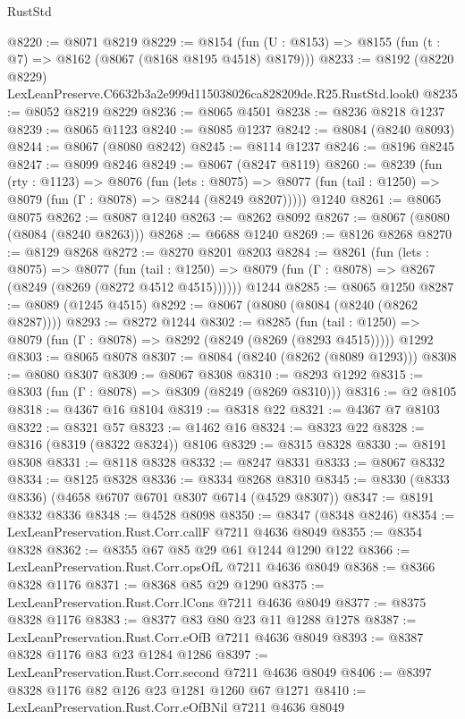 \begin{lexlean}{RustStd}
\begin{coremodule}
@8220 := @8071 @8219
@8229 := @8154 (fun (U : @8153) => @8155 (fun (t : @7) => @8162 (@8067 (@8168 @8195 @4518) @8179)))
@8233 := @8192 (@8220 @8229) LexLeanPreserve.C6632b3a2e999d115038026ca828209de.R25.RustStd.look0
@8235 := @8052 @8219 @8229
@8236 := @8065 @4501
@8238 := @8236 @8218 @1237
@8239 := @8065 @1123
@8240 := @8085 @1237
@8242 := @8084 (@8240 @8093)
@8244 := @8067 (@8080 @8242)
@8245 := @8114 @1237
@8246 := @8196 @8245
@8247 := @8099 @8246
@8249 := @8067 (@8247 @8119)
@8260 := @8239
    (fun (rty : @1123) =>
    @8076
      (fun (lets : @8075) =>
      @8077 (fun (tail : @1250) => @8079 (fun (Γ : @8078) => @8244 (@8249 @8207)))))
    @1240
@8261 := @8065 @8075
@8262 := @8087 @1240
@8263 := @8262 @8092
@8267 := @8067 (@8080 (@8084 (@8240 @8263)))
@8268 := @6688 @1240
@8269 := @8126 @8268
@8270 := @8129 @8268
@8272 := @8270 @8201 @8203
@8284 := @8261
    (fun (lets : @8075) =>
    @8077
      (fun (tail : @1250) => @8079 (fun (Γ : @8078) => @8267 (@8249 (@8269 (@8272 @4512 @4515))))))
    @1244
@8285 := @8065 @1250
@8287 := @8089 (@1245 @4515)
@8292 := @8067 (@8080 (@8084 (@8240 (@8262 @8287))))
@8293 := @8272 @1244
@8302 := @8285
    (fun (tail : @1250) => @8079 (fun (Γ : @8078) => @8292 (@8249 (@8269 (@8293 @4515)))))
    @1292
@8303 := @8065 @8078
@8307 := @8084 (@8240 (@8262 (@8089 @1293)))
@8308 := @8080 @8307
@8309 := @8067 @8308
@8310 := @8293 @1292
@8315 := @8303 (fun (Γ : @8078) => @8309 (@8249 (@8269 @8310)))
@8316 := @2 @8105
@8318 := @4367 @16 @8104
@8319 := @8318 @22
@8321 := @4367 @7 @8103
@8322 := @8321 @57
@8323 := @1462 @16
@8324 := @8323 @22
@8328 := @8316 (@8319 (@8322 @8324)) @8106
@8329 := @8315 @8328
@8330 := @8191 @8308
@8331 := @8118 @8328
@8332 := @8247 @8331
@8333 := @8067 @8332
@8334 := @8125 @8328
@8336 := @8334 @8268 @8310
@8345 := @8330 (@8333 @8336) (@4658 @6707 @6701 @8307 @6714 (@4529 @8307))
@8347 := @8191 @8332 @8336
@8348 := @4528 @8098
@8350 := @8347 (@8348 @8246)
@8354 := LexLeanPreservation.Rust.Corr.callF @7211 @4636 @8049
@8355 := @8354 @8328
@8362 := @8355 @67 @85 @29 @61 @1244 @1290 @122
@8366 := LexLeanPreservation.Rust.Corr.opsOfL @7211 @4636 @8049
@8368 := @8366 @8328 @1176
@8371 := @8368 @85 @29 @1290
@8375 := LexLeanPreservation.Rust.Corr.lCons @7211 @4636 @8049
@8377 := @8375 @8328 @1176
@8383 := @8377 @83 @80 @23 @11 @1288 @1278
@8387 := LexLeanPreservation.Rust.Corr.eOfB @7211 @4636 @8049
@8393 := @8387 @8328 @1176 @83 @23 @1284 @1286
@8397 := LexLeanPreservation.Rust.Corr.second @7211 @4636 @8049
@8406 := @8397 @8328 @1176 @82 @126 @23 @1281 @1260 @67 @1271
@8410 := LexLeanPreservation.Rust.Corr.eOfBNil @7211 @4636 @8049

\end{coremodule}
\end{lexlean}
